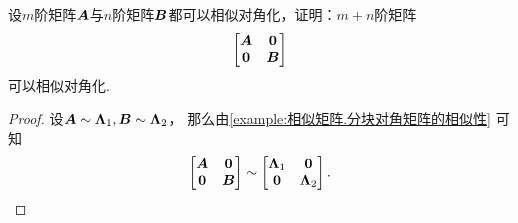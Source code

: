 \begin{example}
设\(m\)阶矩阵\(\boldsymbol{A}\)与\(n\)阶矩阵\(\boldsymbol{B}\)都可以相似对角化，证明：\(m+n\)阶矩阵\[
	\begin{bmatrix} \boldsymbol{A} & \boldsymbol0 \\ \boldsymbol0 & \boldsymbol{B} \end{bmatrix}
\]可以相似对角化.
\begin{proof}
设\(\boldsymbol{A} \sim \boldsymbol\Lambda_1,
\boldsymbol{B} \sim \boldsymbol\Lambda_2\)，
那么由\cref{example:相似矩阵.分块对角矩阵的相似性} 可知\begin{equation*}
	\begin{bmatrix}
		\boldsymbol{A} & \boldsymbol0 \\
		\boldsymbol0 & \boldsymbol{B}
	\end{bmatrix}
	\sim \begin{bmatrix}
		\boldsymbol\Lambda_1 & \boldsymbol0 \\
		\boldsymbol0 & \boldsymbol\Lambda_2
	\end{bmatrix}.
	\qedhere
\end{equation*}
\end{proof}
\end{example}

